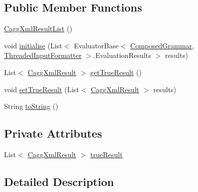 \subsection*{Public Member Functions}
\begin{DoxyCompactItemize}
\item 
\hyperlink{classit_1_1emarolab_1_1cagg_1_1debugging_1_1result2XML_1_1CaggXmlResultList_a6bcf4e0bd6625c7461d7f81be043f075}{Cagg\-Xml\-Result\-List} ()
\item 
void \hyperlink{classit_1_1emarolab_1_1cagg_1_1debugging_1_1result2XML_1_1CaggXmlResultList_a67de963b50535e7cca07d690fe5948f1}{initialise} (List$<$ Evaluator\-Base$<$ \hyperlink{classit_1_1emarolab_1_1cagg_1_1core_1_1evaluation_1_1interfacing_1_1ComposedGrammar}{Composed\-Grammar}, \hyperlink{classit_1_1emarolab_1_1cagg_1_1core_1_1evaluation_1_1inputFormatting_1_1ThreadedInputFormatter}{Threaded\-Input\-Formatter} $>$.Evaluation\-Results $>$ results)
\item 
List$<$ \hyperlink{classit_1_1emarolab_1_1cagg_1_1debugging_1_1result2XML_1_1CaggXmlResult}{Cagg\-Xml\-Result} $>$ \hyperlink{classit_1_1emarolab_1_1cagg_1_1debugging_1_1result2XML_1_1CaggXmlResultList_a5290a283496c718fe797358c922979fb}{get\-True\-Result} ()
\item 
void \hyperlink{classit_1_1emarolab_1_1cagg_1_1debugging_1_1result2XML_1_1CaggXmlResultList_a4eca2a7c9c2d1861e240df8d0b894b05}{set\-True\-Result} (List$<$ \hyperlink{classit_1_1emarolab_1_1cagg_1_1debugging_1_1result2XML_1_1CaggXmlResult}{Cagg\-Xml\-Result} $>$ results)
\item 
String \hyperlink{classit_1_1emarolab_1_1cagg_1_1debugging_1_1result2XML_1_1CaggXmlResultList_a989c3238366db49b998848766bf8ccec}{to\-String} ()
\end{DoxyCompactItemize}
\subsection*{Private Attributes}
\begin{DoxyCompactItemize}
\item 
List$<$ \hyperlink{classit_1_1emarolab_1_1cagg_1_1debugging_1_1result2XML_1_1CaggXmlResult}{Cagg\-Xml\-Result} $>$ \hyperlink{classit_1_1emarolab_1_1cagg_1_1debugging_1_1result2XML_1_1CaggXmlResultList_a45d6f73a46dc0830079017a68a7f2070}{true\-Result}
\end{DoxyCompactItemize}


\subsection{Detailed Description}


